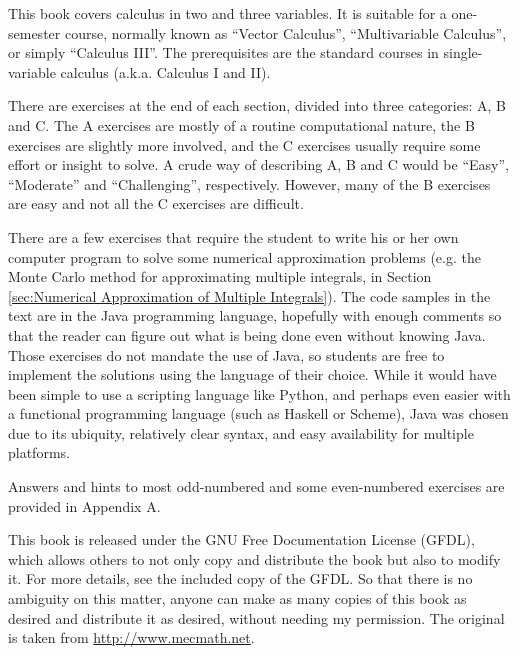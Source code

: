 This book covers calculus in two and three variables. It is suitable for a one-semester course, normally known as
``Vector Calculus'', ``Multivariable Calculus'', or simply ``Calculus III''. The prerequisites are the standard courses
in single-variable calculus (a.k.a. Calculus I and II).

There are exercises at the end of each section, divided into three categories: A, B and C. 
The A exercises are mostly
of a routine computational nature, the B exercises are slightly more involved, and the C exercises usually require
some effort or insight to solve. 
A crude way of describing A, B and C would be ``Easy'', ``Moderate'' and ``Challenging'', respectively. 
However, many of the B exercises are easy and not all
the C exercises are difficult.

There are a few exercises that require the student to write his or her own computer program
to solve some numerical approximation problems (e.g. the Monte Carlo method for approximating multiple integrals, in
Section \ref{sec:Numerical Approximation of Multiple Integrals}).
The code samples in the text are in the Java programming language, hopefully with enough comments so that the reader can
figure out what is being done even without knowing Java. Those exercises do not mandate the use of Java, so
students are free to implement the solutions using the language of their choice. While it would have been simple to
use a scripting language like Python, and perhaps even easier with a functional programming language (such as Haskell or Scheme), 
Java was chosen due to its ubiquity, relatively clear syntax, and easy availability for multiple platforms.

Answers and hints to most odd-numbered and some even-numbered exercises are
provided in Appendix A. 

This book is released under the GNU Free Documentation License (GFDL), which allows others to not only copy and
distribute the book but also to modify it. 
For more details, see the included copy of the GFDL. So that there is no
ambiguity on this matter, anyone can make as many copies of this book as desired and distribute it as desired,
without needing my permission.  
The original is taken from \url{http://www.mecmath.net}. 
